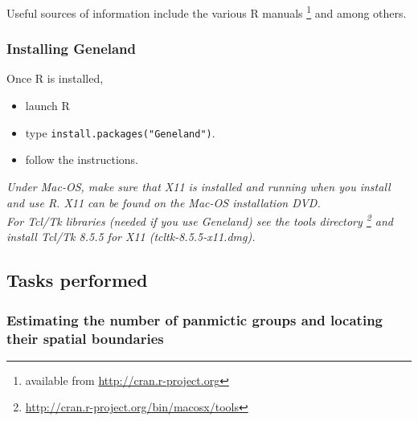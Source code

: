 \documentclass[a4paper,10pt]{article}
\newcommand{\ggr}{\color{red}}
\begin{document}
Useful sources of information include the various R manuals \footnote{available from \url{http://cran.r-project.org}} and 
\citep{Paradis05,Paradis06} among others.


\subsubsection{Installing {\sc Geneland}}\label{sec:installGeneland}

Once R is installed,          
\begin{itemize}    
\item launch R
\item type {\tt install.packages("Geneland")}.
\item follow the instructions.
\end{itemize}




{\ggr \textdbend} {\em Under Mac-OS, make sure that   X11 is installed and running when you install and use R. 
X11 can be found on the Mac-OS installation DVD.\\
For Tcl/Tk libraries (needed if you use {\sc Geneland}) see the tools directory \footnote{\url{http://cran.r-project.org/bin/macosx/tools}} 
and install Tcl/Tk 8.5.5 for X11 (tcltk-8.5.5-x11.dmg).

}






\subsection{Tasks performed}  
\subsubsection{Estimating the number of panmictic groups and locating their spatial boundaries}
\end{document}
